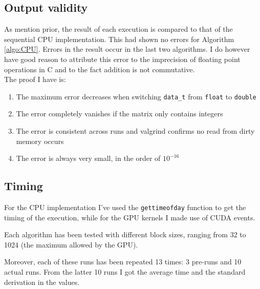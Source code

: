 \documentclass{article}
\begin{document}
\subsection{Output validity}
As mention prior, the result of each execution is compared to that of the sequential CPU implementation. This had shown no errors for Algorithm \ref{algo:CPU}.
Errors in the result occur in the last two algorithms. I do however have good reason to attribute this error to the imprecision of floating point operations in C and to the fact addition is not commutative.\\
The proof I have is:
\begin{enumerate}
    \item The maximum error decreases when switching \texttt{data\_t} from \texttt{float} to \texttt{double}
    \item The error completely vanishes if the matrix only contains integers
    \item The error is consistent across runs and valgrind confirms no read from dirty memory occurs
    \item The error is always very small, in the order of $10^{-16}$
\end{enumerate}
\subsection{Timing}
For the CPU implementation I've used the \texttt{gettimeofday} function to get the timing of the execution, while for the GPU kernels I made use of CUDA events.

Each algorithm has been tested with different block sizes, ranging from 32 to 1024 (the maximum allowed by the GPU).

Moreover, each of these runs has been repeated 13 times: 3 pre-runs and 10 actual runs. From the latter 10 runs I got the average time and the standard derivation in the values.
\end{document}
